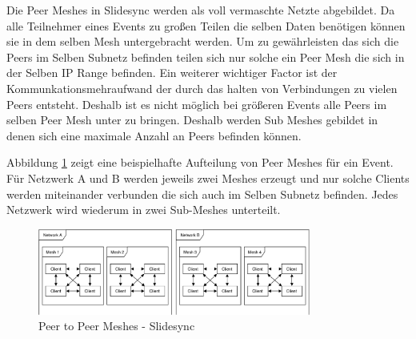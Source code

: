 Die Peer Meshes in Slidesync werden als voll vermaschte Netzte abgebildet. Da alle Teilnehmer eines Events zu großen Teilen die selben Daten benötigen können sie in dem selben Mesh untergebracht werden. Um zu gewährleisten das sich die Peers im Selben Subnetz befinden teilen sich nur solche ein Peer Mesh die sich in der Selben IP Range befinden. Ein weiterer wichtiger Factor ist der Kommunkationsmehraufwand der durch das halten von Verbindungen zu vielen Peers entsteht. Deshalb ist es nicht möglich bei größeren Events alle Peers im selben Peer Mesh unter zu bringen. Deshalb werden Sub Meshes gebildet in denen sich eine maximale Anzahl an Peers befinden können. 

Abbildung \ref{fig:mesh-slidesync} zeigt eine beispielhafte Aufteilung von Peer Meshes für ein Event. Für Netzwerk A und B werden jeweils zwei Meshes erzeugt und nur solche Clients werden miteinander verbunden die sich auch im Selben Subnetz befinden. Jedes Netzwerk wird wiederum in zwei Sub-Meshes unterteilt.

\begin{figure}[!h]
	\centering
	\includegraphics[width=0.8\textwidth]{figures/slidesync_peer_meshes}
	\caption[A Figure Short-Title]{Peer to Peer Meshes - Slidesync}
	\label{fig:mesh-slidesync}
\end{figure}

